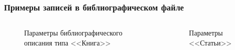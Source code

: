 \documentclass[aspectratio=169]{beamer}
\begin{document}
\begin{frame}
\frametitle{Примеры записей в библиографическом файле}
\medskip
\begin{columns}
\begin{figure}
\centering
{}
\caption{Параметры библиографического описания типа <<Книга>>}
\end{figure}
\begin{figure}
\centering
{}
\caption{Параметры <<Статьи>>}
\end{figure}
\end{columns}
\end{frame}
\end{document}
